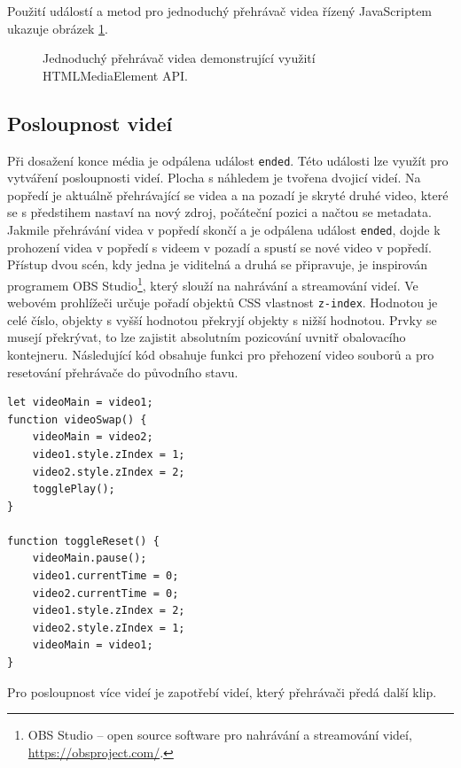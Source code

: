 Použití událostí a metod pro jednoduchý přehrávač videa řízený JavaScriptem ukazuje obrázek \ref{img:html-control}.

\begin{figure}[h]
	\centering
	\caption{Jednoduchý přehrávač videa demonstrující využití HTMLMediaElement API.}\label{img:html-control}
\end{figure}

\subsection{Posloupnost videí}
Při dosažení konce média je odpálena událost \texttt{ended}. Této události lze využít pro vytváření posloupnosti videí. Plocha s náhledem je tvořena dvojicí videí. Na popředí je aktuálně přehrávající se videa a na pozadí je skryté druhé video, které se s předstihem nastaví na nový zdroj, počáteční pozici a načtou se metadata. Jakmile přehrávání videa v popředí skončí a je odpálena událost \texttt{ended}, dojde k prohození videa v popředí s videem v pozadí a spustí se nové video v popředí. Přístup dvou scén, kdy jedna je viditelná a druhá se připravuje, je inspirován programem OBS Studio\footnote{OBS Studio -- open source software pro nahrávání a streamování videí, \url{https://obsproject.com/}.}, který slouží na nahrávání a streamování videí. Ve webovém prohlížeči určuje pořadí objektů CSS vlastnost \texttt{z-index}. Hodnotou je celé číslo, objekty s vyšší hodnotou překryjí objekty s nižší hodnotou. Prvky se musejí překrývat, to lze zajistit absolutním pozicování uvnitř obalovacího kontejneru. Následující kód obsahuje funkci pro přehození video souborů a pro resetování přehrávače do původního stavu.
\begin{lstlisting}[style=JavaScript]
let videoMain = video1;
function videoSwap() {
    videoMain = video2;
    video1.style.zIndex = 1;
    video2.style.zIndex = 2;
    togglePlay();
}

function toggleReset() {
    videoMain.pause();
    video1.currentTime = 0;
    video2.currentTime = 0;
    video1.style.zIndex = 2;
    video2.style.zIndex = 1;
    videoMain = video1;
}
\end{lstlisting}
Pro posloupnost více videí je zapotřebí  videí, který přehrávači předá další klip.

